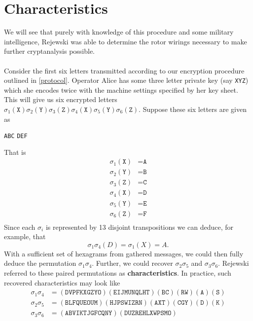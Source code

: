 \section{Characteristics}
We will see that purely with knowledge of this procedure and some
military intelligence, Rejewski was able to determine the rotor
wirings necessary to make further cryptanalysis possible.
\\\\Consider the first six letters transmitted according to our
encryption procedure outlined in \ref{protocol}. Operator Alice has some three letter private
key (say \texttt{XYZ}) which she encodes twice with the machine
settings specified by her key sheet. This will give us six encrypted
letters
$\sigma_1(\texttt{X})\sigma_2(\texttt{Y})\sigma_3(\texttt{Z})\sigma_4(\texttt{X})\sigma_5(\texttt{Y})\sigma_6(\texttt{Z})$.
Suppose these six letters are given as
\begin{center}
	\texttt{ABC} \texttt{DEF}
\end{center}
That is
\begin{align*}
	\sigma_1(\texttt{X}) & = \texttt{A} \\
	\sigma_2(\texttt{Y}) & = \texttt{B} \\
	\sigma_3(\texttt{Z}) & = \texttt{C} \\
	\sigma_4(\texttt{X}) & = \texttt{D} \\
	\sigma_5(\texttt{Y}) & = \texttt{E} \\
	\sigma_6(\texttt{Z}) & = \texttt{F} \\
\end{align*}
Since each $\sigma_i$ is represented by 13 disjoint transpositions we
can deduce, for example, that
\[
	\sigma_1\sigma_4(D) = \sigma_1(X) = A.
\]
With a sufficient set of hexagrams from gathered messages, we could
then fully deduce the permutation $\sigma_1\sigma_4$. Further, we
could recover $\sigma_2\sigma_5$ and $\sigma_3\sigma_6$. Rejewski
referred to these paired permutations as {\bf{characteristics}}. In
practice, such recovered characteristics may look like
\begin{align*}
	\sigma_1\sigma_4 & =
	(\texttt{DVPFKXGZYO})(\texttt{EIJMUNQLHT})(\texttt{BC})(\texttt{RW})(\texttt{A})(\texttt{S})
	\\
	\sigma_2\sigma_5 & =
	(\texttt{BLFQUEOUM})(\texttt{HJPSWIZRN})(\texttt{AXT})(\texttt{CGY})(\texttt{D})(\texttt{K})
	\\
	\sigma_3\sigma_6 & = (\texttt{ABVIKTJGFCQNY})(\texttt{DUZREHLXWPSMO})
\end{align*}
